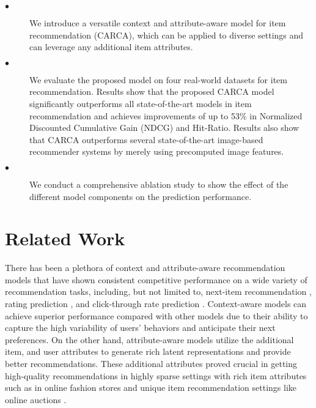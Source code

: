 \documentclass[sigconf,natbib=true]{acmart}
\begin{document}
\begin{description}
 \item[$\bullet$] We introduce a versatile context and attribute-aware model for item recommendation (CARCA), which can be applied to diverse settings and can leverage any additional item attributes.
 \item[$\bullet$] We evaluate the proposed model on four real-world datasets for item recommendation. Results show that the proposed CARCA model significantly outperforms all state-of-the-art models in item recommendation and achieves improvements of up to 53\% in Normalized Discounted Cumulative Gain (NDCG) and Hit-Ratio. Results also show that CARCA outperforms several state-of-the-art image-based recommender systems by merely using precomputed image features.
 \item[$\bullet$] 
We conduct a comprehensive ablation study to show the effect of the different model components on the prediction performance.
\end{description}

\section{Related Work}
There has been a plethora of context and attribute-aware recommendation models that have shown consistent competitive performance on a wide variety of recommendation tasks, including, but not limited to, next-item recommendation \cite{rashed2020multirec,sun2019bert4rec,ZhouWZZWZWW20,zhang2019feature,wu2019stochastic}, rating prediction \cite{rashed2019attribute,rendle2010factorization,zhang2017autosvd++}, and click-through rate prediction \cite{guo2017deepfm,zhou2018deep,xin2019cfm,zhou2019deep}. Context-aware models \cite{rendle2010factorization,guo2017deepfm,zhou2018deep,xin2019cfm,zhou2019deep} can achieve superior performance compared with other models due to their ability to capture the high variability of users' behaviors and anticipate their next preferences. On the other hand, attribute-aware models \cite{he2016vbpr,rashed2019attribute,zhang2017autosvd++,rashed2020multirec,ZhouWZZWZWW20,zhang2019feature} utilize the additional item, and user attributes to generate rich latent representations and provide better recommendations.
These additional attributes proved crucial in getting high-quality recommendations in highly sparse settings with rich item attributes such as in online fashion stores \cite{he2016vbpr} and unique item recommendation settings like online auctions \cite{rashed2020multirec}.
\end{document}
